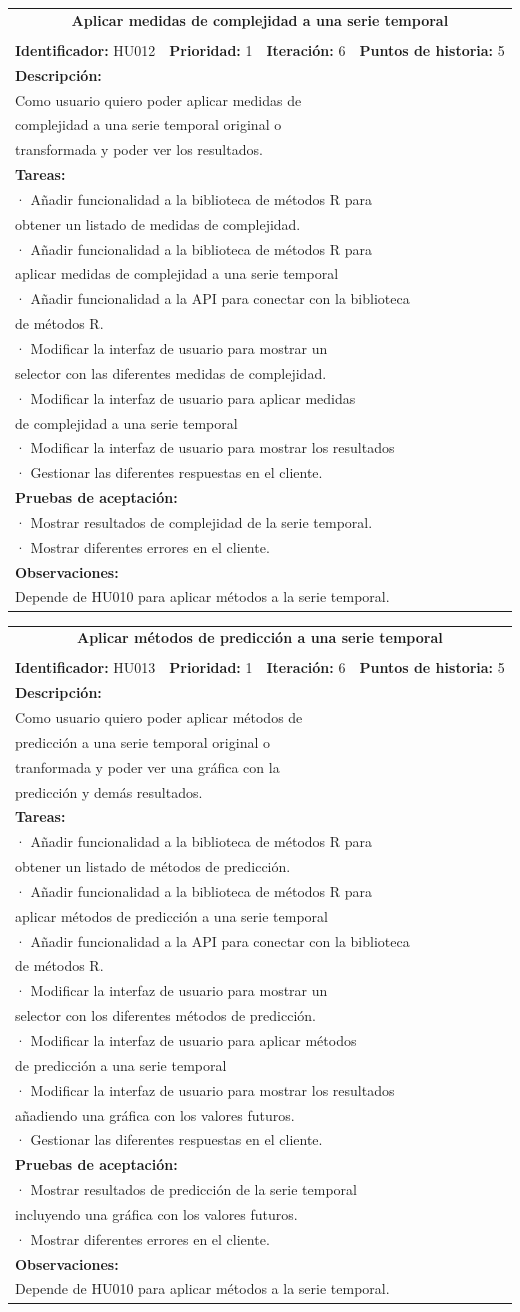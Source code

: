 \documentclass[14pt]{extarticle}
\theoremstyle{definition}
\theoremstyle{remark}
\newcommand{\newtableitem}[1] {
	\multicolumn{4}{|l|}{· #1} \\
}
\newcommand{\newtableline}[1] { %
	\multicolumn{4}{|l|}{#1} \\
}
\newcommand{\userstory}[9]{
	\begin{center}
	\resizebox{15cm}{!} {
	\begin{tabular}{|c|c|c|c|}
    	\hline 
		\multicolumn{4}{|c|}{\textbf{#1}} \\
		\multicolumn{4}{|c|}{} \\
		\hline	
		\textbf{Identificador:} #2 & \textbf{Prioridad:} #3 & \textbf{Iteración:} #4 & \textbf{Puntos de historia:} #5 \\ 
		\hline 
		\multicolumn{4}{|l|}{\textbf{Descripción:}} \\
		#6
		\hline 
		\multicolumn{4}{|l|}{\textbf{Tareas:}} \\
		#7
		\hline 
		\multicolumn{4}{|l|}{\textbf{Pruebas de aceptación:}} \\
		#8
		\hline 
		\multicolumn{4}{|l|}{\textbf{Observaciones:}} \\
		#9
		\hline 
	\end{tabular}
	}
	\end{center}
}
\begin{document}
\userstory {Aplicar medidas de complejidad a una serie temporal}
{HU012}{1}{6}{5}
{
	\newtableline {Como usuario quiero poder aplicar medidas de}
	\newtableline { complejidad a una serie temporal original o }
	\newtableline { transformada y poder ver los resultados.}
}
{ %
	\newtableitem {Añadir funcionalidad a la biblioteca de métodos R para}
		\newtableline { obtener un listado de medidas de complejidad.}
	\newtableitem {Añadir funcionalidad a la biblioteca de métodos R para}
		\newtableline { aplicar medidas de complejidad a una serie temporal}
	\newtableitem {Añadir funcionalidad a la API para conectar con la biblioteca}
		\newtableline { de métodos R.}
	\newtableitem {Modificar la interfaz de usuario para mostrar un}
		\newtableline { selector con las diferentes medidas de complejidad.}
	\newtableitem {Modificar la interfaz de usuario para aplicar medidas}
		\newtableline { de complejidad a una serie temporal}
	\newtableitem {Modificar la interfaz de usuario para mostrar los resultados}
	\newtableitem {Gestionar las diferentes respuestas en el cliente.}
}
{ %
	\newtableitem {Mostrar resultados de complejidad de la serie temporal.}
	\newtableitem {Mostrar diferentes errores en el cliente.}
}
{ %
	\newtableline {Depende de HU010 para aplicar métodos a la serie temporal.} 
}

\userstory {Aplicar métodos de predicción a una serie temporal}
{HU013}{1}{6}{5}
{
	\newtableline {Como usuario quiero poder aplicar métodos de}
	\newtableline { predicción a una serie temporal original o}
	\newtableline { tranformada y poder ver una gráfica con la}
	\newtableline { predicción y demás resultados.}
}
{ %
	\newtableitem {Añadir funcionalidad a la biblioteca de métodos R para}
		\newtableline { obtener un listado de métodos de predicción.}
	\newtableitem {Añadir funcionalidad a la biblioteca de métodos R para}
		\newtableline { aplicar métodos de predicción a una serie temporal}
	\newtableitem {Añadir funcionalidad a la API para conectar con la biblioteca}
		\newtableline { de métodos R.}
	\newtableitem {Modificar la interfaz de usuario para mostrar un}
		\newtableline { selector con los diferentes métodos de predicción.}
	\newtableitem {Modificar la interfaz de usuario para aplicar métodos}
		\newtableline { de predicción a una serie temporal}
	\newtableitem {Modificar la interfaz de usuario para mostrar los resultados}
		\newtableline { añadiendo una gráfica con los valores futuros.}
	\newtableitem {Gestionar las diferentes respuestas en el cliente.}
}
{ %
	\newtableitem {Mostrar resultados de predicción de la serie temporal}
		\newtableline { incluyendo una gráfica con los valores futuros.}
	\newtableitem {Mostrar diferentes errores en el cliente.}
}
{ %
	\newtableline {Depende de HU010 para aplicar métodos a la serie temporal.} 
}
\end{document}
